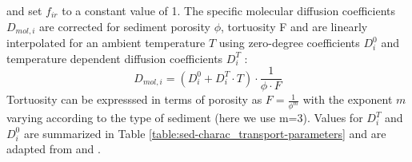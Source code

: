 \documentclass[gmd, manuscript]{copernicus}
\begin{document}
and set $f_{ir}$ to a constant value of 1. The specific molecular diffusion coefficients $D_{mol,i}$ are corrected for sediment porosity $\phi$, tortuosity F and are linearly interpolated for an ambient temperature $T$ using zero-degree 
coefficients $D^0_i$ and temperature dependent diffusion coefficients $D^T_i$ \citep[compare ][]{gypens_simple_2008}:
\begin{equation*}
 D_{mol,i} = (D^0_i + D^T_i \cdot T )\cdot \frac{1}{\phi\cdot F}
\end{equation*}
Tortuosity can be expresssed in terms of porosity as $F = \frac{1}{\phi^m}$ \citep{ullman_diffusion_1982} with the exponent $m$ varying according to the type of sediment (here we use m=3). 
Values for $D^T_i$ and $D^0_i$ are summarized in Table \ref{table:sed-charac_transport-parameters} and are adapted from \citet{Li_diffusion_1974} and \citet{gypens_simple_2008}.
\end{document}

